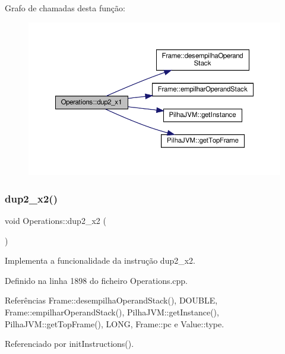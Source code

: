 Grafo de chamadas desta função\+:
\nopagebreak
\begin{figure}[H]
\begin{center}
\leavevmode
\includegraphics[width=350pt]{classOperations_a57b0cf4d7a133bf35b39fcf8d6e15511_cgraph}
\end{center}
\end{figure}
\mbox{\label{classOperations_ab49247b3958376b27e8347e053dfe7de}} 
\subsubsection{\texorpdfstring{dup2\+\_\+x2()}{dup2\_x2()}}
{\footnotesize\ttfamily void Operations\+::dup2\+\_\+x2 (\begin{DoxyParamCaption}{ }\end{DoxyParamCaption})\hspace{0.3cm}{\ttfamily [private]}}



Implementa a funcionalidade da instrução dup2\+\_\+x2. 



Definido na linha 1898 do ficheiro Operations.\+cpp.



Referências Frame\+::desempilha\+Operand\+Stack(), D\+O\+U\+B\+LE, Frame\+::empilhar\+Operand\+Stack(), Pilha\+J\+V\+M\+::get\+Instance(), Pilha\+J\+V\+M\+::get\+Top\+Frame(), L\+O\+NG, Frame\+::pc e Value\+::type.



Referenciado por init\+Instructions().

